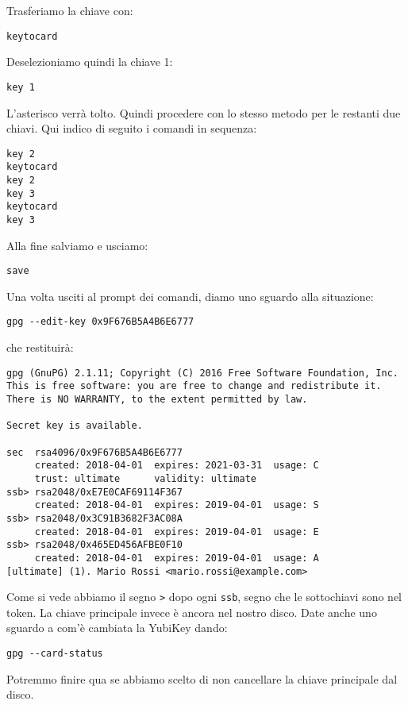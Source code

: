 Trasferiamo la chiave con:

\begin{lstlisting}
keytocard
\end{lstlisting}

Deselezioniamo quindi la chiave 1:

\begin{lstlisting}
key 1
\end{lstlisting}

L'asterisco verrà tolto. Quindi procedere con lo stesso metodo per le restanti
due chiavi. Qui indico di seguito i comandi in sequenza:

\begin{lstlisting}
key 2
keytocard
key 2
key 3
keytocard
key 3
\end{lstlisting}

Alla fine salviamo e usciamo:

\begin{lstlisting}
save
\end{lstlisting}

Una volta usciti al prompt dei comandi, diamo uno sguardo alla situazione:

\begin{lstlisting}
gpg --edit-key 0x9F676B5A4B6E6777
\end{lstlisting}

che restituirà:

\begin{lstlisting}
gpg (GnuPG) 2.1.11; Copyright (C) 2016 Free Software Foundation, Inc.
This is free software: you are free to change and redistribute it.
There is NO WARRANTY, to the extent permitted by law.

Secret key is available.

sec  rsa4096/0x9F676B5A4B6E6777
     created: 2018-04-01  expires: 2021-03-31  usage: C
     trust: ultimate      validity: ultimate
ssb> rsa2048/0xE7E0CAF69114F367
     created: 2018-04-01  expires: 2019-04-01  usage: S
ssb> rsa2048/0x3C91B3682F3AC08A
     created: 2018-04-01  expires: 2019-04-01  usage: E
ssb> rsa2048/0x465ED456AFBE0F10
     created: 2018-04-01  expires: 2019-04-01  usage: A
[ultimate] (1). Mario Rossi <mario.rossi@example.com>
\end{lstlisting}

Come si vede abbiamo il segno \texttt{>} dopo ogni \texttt{ssb}, segno che le
sottochiavi sono nel token. La chiave principale invece è ancora nel nostro
disco. Date anche uno sguardo a com'è cambiata la YubiKey dando:

\begin{lstlisting}
gpg --card-status
\end{lstlisting}

Potremmo finire qua se abbiamo scelto di non cancellare la chiave principale dal
disco.
